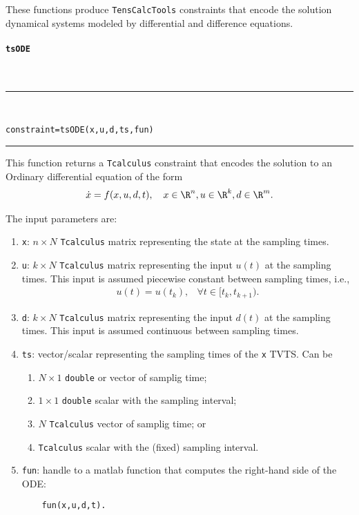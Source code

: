 \documentclass[11pt]{article}
\newcommand{\TC}{\texttt{TensCalcTools}}
\newcommand{\codesize}{\footnotesize}
\newcommand{\toidx}[1]{\index{\lstinline{#1}}}%
\newenvironment{command}[1]{\toidx{#1}\addcontentsline{toc}{subsection}{\lstinline{#1}}\paragraph*{\lstinline[basicstyle=\large,columns={[l]flexible}]{#1}}~\\\noindent\rule{\textwidth}{2pt}\\\vspace{-3ex}\codesize}{\vspace{-3ex}\rule{\textwidth}{1pt}\medskip\noindent}
\begin{document}
These functions produce \TC{} constraints that encode the solution
dynamical systems modeled by differential and difference equations.

\begin{command}{tsODE}
\begin{lstlisting}
constraint=tsODE(x,u,d,ts,fun)
\end{lstlisting}
\end{command}

This function returns a \lstinline{Tcalculus} constraint that encodes
the solution to an Ordinary differential equation of the form
\begin{align*}
  \dot x = f(x,u,d,t), \quad x\in\R^n, u\in\R^k, d\in\R^m.
\end{align*}


The input parameters are:
\begin{enumerate}
\item \lstinline{x}: $n\times N$ \lstinline{Tcalculus} matrix representing
  the state at the sampling times.

\item \lstinline{u}: $k\times N$ \lstinline{Tcalculus} matrix representing
  the input $u(t)$ at the sampling times. This input is assumed
  piecewise constant between sampling times, i.e.,
  \begin{align*}
    u(t)=u(t_k), &\forall t\in[t_k,t_{k+1}).
  \end{align*}
  
\item \lstinline{d}: $k\times N$ \lstinline{Tcalculus} matrix representing
  the input $d(t)$ at the sampling times. This input is assumed
  continuous between sampling times.

\item \lstinline{ts}: vector/scalar representing the sampling times of
  the \lstinline{x} TVTS. Can be
  \begin{enumerate}
  \item $N\times1$ \lstinline{double} or vector of samplig time;
  \item $1\times1$ \lstinline{double} scalar with the sampling interval;
  \item $N$ \lstinline{Tcalculus} vector of samplig time; or
  \item \lstinline{Tcalculus} scalar with the (fixed) sampling interval.
  \end{enumerate}

\item \lstinline{fun}: handle to a matlab function that computes the
  right-hand side of the ODE:
  \begin{lstlisting}
    fun(x,u,d,t).
  \end{lstlisting}


\end{enumerate}
\end{document}
